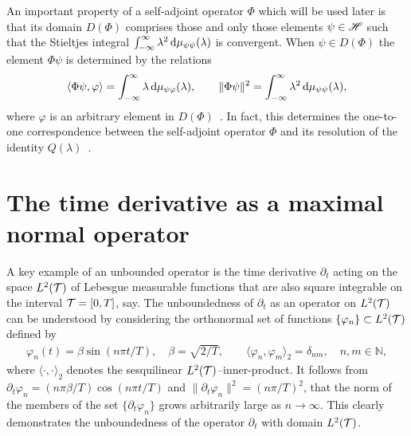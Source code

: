 \documentclass[amsa]{ipart}
\begin{document}
An important property of a self-adjoint operator $\Phi$ which will be
used later is that its domain $D(\Phi)$ comprises those and only those
elements $\psi\in\mathscr{H}$ such that the Stieltjes integral
$\int_{-\infty}^\infty\lambda^2\,\mathrm{d}\mu_{\psi\psi}(\lambda)$ is convergent. When $\psi\in D(\Phi)$ the element
$\Phi\psi$ is determined by the relations~\cite{Stone:64}      
%
\begin{align}\label{eq:X_Q_Correspondence}
  \langle\Phi\psi,\varphi\rangle=\int_{-\infty}^\infty\lambda\,\d\mu_{\psi\varphi}(\lambda), \qquad
  \|\Phi\psi\|^2=\int_{-\infty}^\infty\lambda^2\,\d\mu_{\psi\psi}(\lambda),
\end{align}
%
where $\varphi$ is an arbitrary element in $D(\Phi)$~\cite{Stone:64}. In fact,
this determines the one-to-one correspondence between the
self-adjoint operator $\Phi$ and its resolution of the identity
$Q(\lambda)$~\cite{Stone:64}. 





\section{The time derivative as a maximal normal
  operator}\label{sec:Time_Derivative}
%
A key example of an unbounded operator is the time derivative
$\partial_t$ acting on the space $L^2(\mathcal{T})$ of Lebesgue measurable functions
that are also square integrable on the interval $\mathcal{T}=[0,T]$, say. The
unboundedness of $\partial_t$ as an operator on $L^2(\mathcal{T})$ can be 
understood by considering the orthonormal set of functions
$\{\varphi_n\}\subset L^2(\mathcal{T})$ defined by     
%
\begin{align}\label{eq:Orthonormal}
  \varphi_n(t)=\beta\sin(n\pi t/T), \quad
  \beta=\sqrt{2/T},
  \qquad
  \langle\varphi_n,\varphi_m\rangle_2=\delta_{nm}, \quad
  n,m\in\mathbb{N},
\end{align}
%
where $\langle\cdot,\cdot\rangle_2$ denotes the sesquilinear
$L^2(\mathcal{T})$--inner-product. It follows from $\partial_t\varphi_n=(n\pi\beta/T)\cos(n\pi t/T)$
and $\|\partial_t\varphi_n\|^2=(n\pi/T)^2$, that the norm of the members of the set
$\{\partial_t\varphi_n\}$ grows arbitrarily large as $n\to\infty$. This clearly demonstrates
the unboundedness of the operator $\partial_t$ with domain $L^2(\mathcal{T})$.
\end{document}
